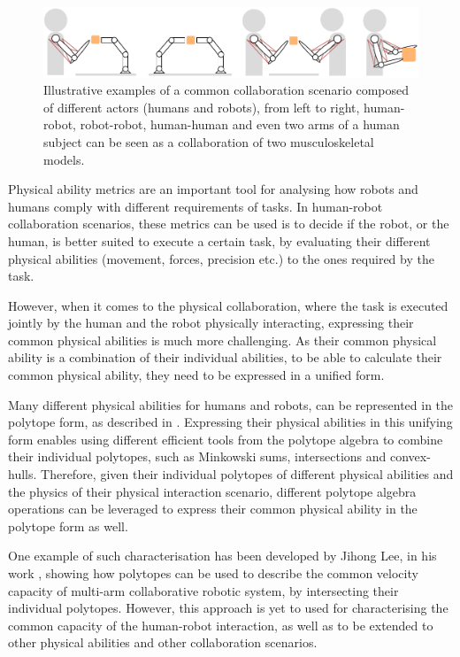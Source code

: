 \begin{figure}[!h]
    \centering
    \includegraphics[width=\linewidth]{Chapters/imgs/collaboration.pdf}
    \caption{Illustrative examples of a common collaboration scenario composed of different actors (humans and robots), from left to right, human-robot, robot-robot, human-human and even two arms of a human subject can be seen as a collaboration of two musculoskeletal models.}
    \label{fig:collaboration_types}
\end{figure}

Physical ability metrics are an important tool for analysing how robots and humans comply with different requirements of tasks. In human-robot collaboration scenarios, these metrics can be used is to decide if the robot, or the human, is better suited to execute a certain task, by evaluating their different physical abilities (movement, forces, precision etc.) to the ones required by the task\cite{Edoardo2019Capability}. 

However, when it comes to the physical collaboration, where the task is executed jointly by the human and the robot physically interacting, expressing their common physical abilities is much more challenging. As their common physical ability is a combination of their individual abilities, to be able to calculate their common physical ability, they need to be expressed in a unified form.  

Many different physical abilities for humans and robots, can be represented in the polytope form, as described in . Expressing their physical abilities in this unifying form enables using different efficient tools from the polytope algebra to combine their individual polytopes, such as Minkowski sums, intersections and convex-hulls.
Therefore, given their individual polytopes of different physical abilities and the physics of their physical interaction scenario, different polytope algebra operations can be leveraged to express their common physical ability in the polytope form as well.

One example of such characterisation has been developed by Jihong Lee, in his work \cite{lee2001velocity}, showing how polytopes can be used to describe the common velocity capacity of multi-arm collaborative robotic system, by intersecting their individual polytopes. However, this approach is yet to used for characterising the common capacity of the human-robot interaction, as well as to be extended to other physical abilities and other collaboration scenarios. 



